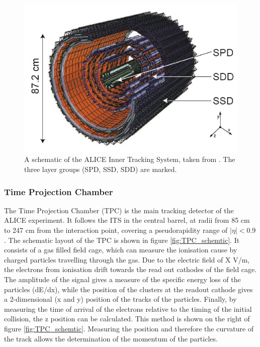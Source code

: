 \begin{figure}[hbtp]
    \centering
    \includegraphics[width=\textwidth]{figures/ITS_figure.jpeg}
    \caption{A schematic of the ALICE Inner Tracking System, taken from \cite{}. The three layer groups (SPD, SSD, SDD) are marked. }
    \label{fig:ITS_schematic}
\end{figure}

\subsubsection{Time Projection Chamber}
The Time Projection Chamber (TPC) is the main tracking detector of the ALICE experiment. It follows the ITS in the central barrel, at radii from 85 cm to 247 cm from the interaction point, covering a pseudorapidity range of $|\eta|<0.9$. The schematic layout of the TPC is shown in figure \ref{fig:TPC_schemtic}. It consists of a gas filled field cage, which can measure the ionisation cause by charged particles travelling through the gas. Due to the electric field of X V/m, the electrons from ionisation drift towards the read out cathodes of the field cage. The amplitude of the signal gives a measure of the specific energy loss of the particles (dE/dx), while the position of the clusters at the readout cathode gives a 2-dimensional (x and y) position of the tracks of the particles. Finally, by measuring the time of arrival of the electrons relative to the timing of the initial collision, the z position can be calculated. This method is shown on the right of figure \ref{fig:TPC_schemtic}. Measuring the position and therefore the curvature of the track allows the determination of the momentum of the particles. 

